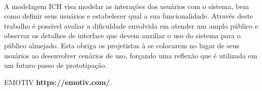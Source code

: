 \documentclass[12pt]{article}
\begin{document}
\paragraph{} A modelagem ICH visa modelar as interações dos usuários com o sistema, bem como definir seus usuários e estabelecer qual a sua funcionalidade. Através deste trabalho é possível avaliar a dificuldade envolvida em atender um amplo público e observar os detalhes de interface que devem auxiliar o uso do sistema para o público almejado. Esta obriga os projetistas à se colocarem no lugar de seus usuários ao desenvolver cenários de uso, forçando uma reflexão que é utilizada em um futuro passo de prototipação.



\begin{thebibliography}{99}                  
 EMOTIV \textbf{https://emotiv.com/}.
\end{thebibliography}     
\end{document}
